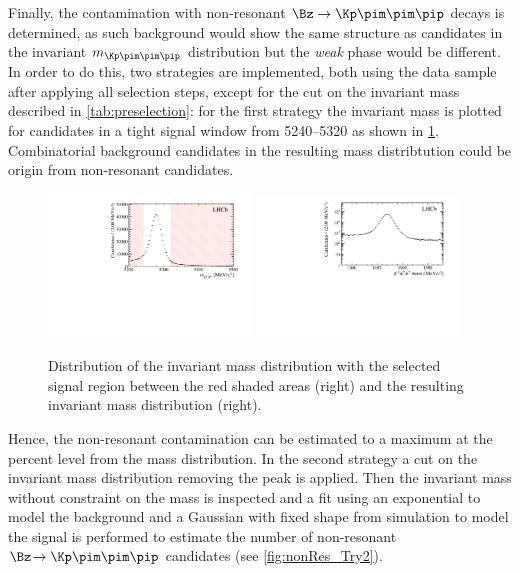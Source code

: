 Finally, the contamination with non-resonant $\Bz\to\Kp\pim\pim\pip$ decays is determined, as such background would show the same structure as \BdToDpi candidates in the invariant $m_{\Kp\pim\pim\pip}$ distribution but the \emph{weak} phase would be different.
In order to do this, two strategies are implemented, both using the data sample after applying all selection steps, except for the cut on the invariant \Dm mass described in \cref{tab:preselection}:
for the first strategy the invariant \Dm mass is plotted for candidates in a tight \Bz signal window from \SIrange[per-mode=symbol]{5240}{5320}{\MeVcc} as shown in \cref{fig:nonRes_Try1}.
Combinatorial background candidates in the resulting \Dm mass distribtution could be origin from non-resonant \Kpm\pimp\pimp\pipm candidates.
\begin{figure}[tb]
    \centering
    \includegraphics[width=0.48\textwidth]{07selection/figs/BmassCut.pdf}
    \includegraphics[width=0.48\textwidth]{07selection/figs/Resulting_Dmass.pdf}
    \caption{Distribution of the invariant \Bz mass distribution with the selected signal region between the red shaded areas (right) and the resulting invariant \Dm mass distribution (right).}
    \label{fig:nonRes_Try1}
\end{figure}
Hence, the non-resonant contamination can be estimated to a maximum at the percent level from the \Dm mass distribution.
In the second strategy a cut on the invariant \Dm mass distribution removing the \Dm peak is applied.
Then the invariant \Bz mass without constraint on the \Dm mass is inspected and a fit using an exponential to model the background and a Gaussian with fixed shape from simulation to model the signal is performed to estimate the number of non-resonant $\Bz\!\to\Kp\pim\pim\pip$ candidates (see \cref{fig:nonRes_Try2}).
